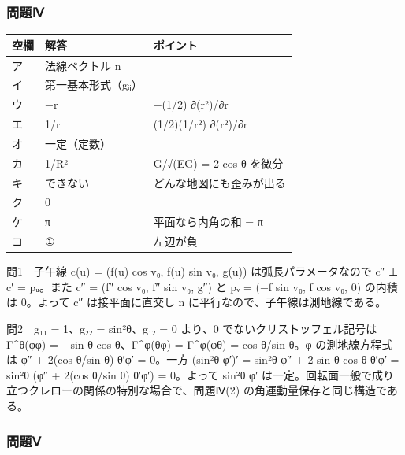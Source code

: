 \documentclass[
  10pt,
  a4paper,
]{article}
\begin{document}
\hypertarget{ux554fux984cux2173}{%
\subsubsection{問題Ⅳ}\label{ux554fux984cux2173}}

\begin{longtable}[]{@{}lll@{}}
\toprule\noalign{}
空欄 & 解答 & ポイント \\
\midrule\noalign{}
\endhead
\bottomrule\noalign{}
\endlastfoot
ア & 法線ベクトル n & \\
イ & 第一基本形式（g{\fallbackfont ᵢⱼ}） & \\
ウ & −r & −(1/2) ∂(r²)/∂r \\
エ & 1/r & (1/2)(1/r²) ∂(r²)/∂r \\
オ & 一定（定数） & \\
カ & 1/R² & G/√(EG) = 2 cos θ を微分 \\
キ & できない & どんな地図にも歪みが出る \\
ク & 0 & \\
ケ & π & 平面なら内角の和 = π \\
コ & ① & 左辺が負 \\
\end{longtable}

問1　子午線 c(u) = (f(u) cos v{\fallbackfont ₀}, f(u) sin
v{\fallbackfont ₀}, g(u)) は弧長パラメータなので c″ ⊥ c′ =
p{\fallbackfont ᵤ}。また c″ = (f″ cos v{\fallbackfont ₀}, f″ sin
v{\fallbackfont ₀}, g″) と p{\fallbackfont ᵥ} = (−f sin
v{\fallbackfont ₀}, f cos v{\fallbackfont ₀}, 0) の内積は 0。よって c″
は接平面に直交し n に平行なので、子午線は測地線である。

問2　g{\fallbackfont ₁₁} = 1、g{\fallbackfont ₂₂} =
sin²θ、g{\fallbackfont ₁₂} = 0 より、0 でないクリストッフェル記号は
Γ\^{}θ(φφ) = −sin θ cos θ、Γ\^{}φ(θφ) = Γ\^{}φ(φθ) = cos θ/sin θ。φ
の測地線方程式は φ″ + 2(cos θ/sin θ) θ′φ′ = 0。一方 (sin²θ φ′)′ = sin²θ
φ″ + 2 sin θ cos θ θ′φ′ = sin²θ (φ″ + 2(cos θ/sin θ) θ′φ′) = 0。よって
sin²θ φ′
は一定。回転面一般で成り立つクレローの関係の特別な場合で、問題Ⅳ(2)
の角運動量保存と同じ構造である。

\hypertarget{ux554fux984cux2174}{%
\subsubsection{問題Ⅴ}\label{ux554fux984cux2174}}
\end{document}
